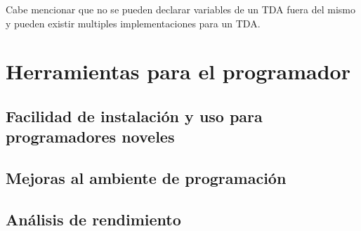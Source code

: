 Cabe mencionar que no se pueden declarar variables de un TDA fuera del mismo y
pueden existir multiples implementaciones para un TDA.

\section{Herramientas para el programador}
\subsection{Facilidad de instalación y uso para programadores noveles}
\blindtext[1]

\subsection{Mejoras al ambiente de programación}
\blindtext[1]

\subsection{Análisis de rendimiento}
\blindtext[1]
